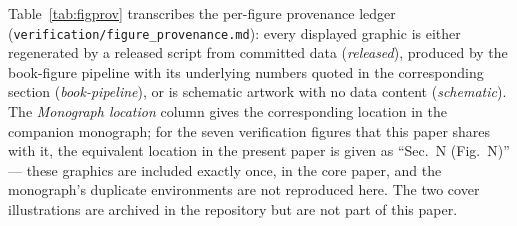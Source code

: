 \documentclass[aps,prd,preprint,superscriptaddress,nofootinbib]{revtex4-2}
\begin{document}
Table~\ref{tab:figprov} transcribes the per-figure provenance ledger (\texttt{verification/\allowbreak figure\_\allowbreak provenance.md}): every displayed graphic is either regenerated by a released script from committed data (\emph{released}), produced by the book-figure pipeline with its underlying numbers quoted in the corresponding section (\emph{book-pipeline}), or is schematic artwork with no data content (\emph{schematic}). The \emph{Monograph location} column gives the corresponding location in the companion monograph; for the seven verification figures that this paper shares with it, the equivalent location in the present paper is given as ``Sec.~N (Fig.~N)'' --- these graphics are included exactly once, in the core paper, and the monograph's duplicate environments are not reproduced here. The two cover illustrations are archived in the repository but are not part of this paper.
\end{document}
